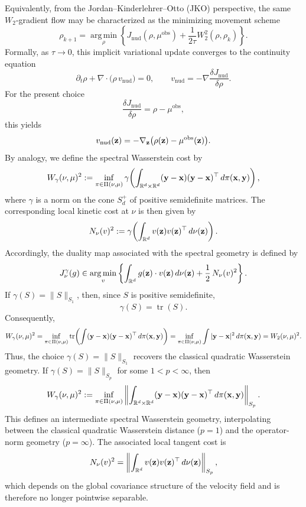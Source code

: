 \documentclass{article}
\theoremstyle{definition}
\begin{document}
Equivalently, from the Jordan--Kinderlehrer--Otto (JKO) perspective, the same $W_2$-gradient flow may be characterized as the minimizing movement scheme
\[
\rho_{k+1}
=
\operatorname*{arg\,min}_{\rho}
\left\{
J_{\mathrm{nud}}(\rho,\mu^{\mathrm{obs}})
+
\frac{1}{2\tau}W_2^2(\rho,\rho_k)
\right\}.
\]
Formally, as $\tau\to 0$, this implicit variational update converges to the continuity equation
\[
\partial_t \rho + \nabla\cdot\bigl(\rho\,v_{\mathrm{nud}}\bigr)=0,
\qquad
v_{\mathrm{nud}}=-\nabla\frac{\delta J_{\mathrm{nud}}}{\delta \rho}.
\]
For the present choice
\[
\frac{\delta J_{\mathrm{nud}}}{\delta \rho}
=
\rho-\mu^{\mathrm{obs}},
\]
this yields
\[
v_{\mathrm{nud}}(\mathbf{z})
=
-\nabla_{\mathbf{z}}\bigl(\rho(\mathbf{z})-\mu^{\mathrm{obs}}(\mathbf{z})\bigr).
\]
By analogy, we define the spectral Wasserstein cost by
\[
W_\gamma(\nu,\mu)^2
:=
\inf_{\pi\in\Pi(\nu,\mu)}
\gamma\!\left(
\int_{\mathbb R^d\times\mathbb R^d}
(\mathbf{y}-\mathbf{x})(\mathbf{y}-\mathbf{x})^\top\,d\pi(\mathbf{x},\mathbf{y})
\right),
\]
where $\gamma$ is a norm on the cone $S_d^+$ of positive semidefinite matrices. The corresponding local kinetic cost at $\nu$ is then given by
\[
N_\nu(v)^2
:=
\gamma\!\left(
\int_{\mathbb R^d} v(\mathbf{z})v(\mathbf{z})^\top\,d\nu(\mathbf{z})
\right).
\]
Accordingly, the duality map associated with the spectral geometry is defined by
\[
J_\nu^\gamma(g)
\in
\operatorname*{arg\,min}_{v}
\left\{
\int_{\mathbb R^d} g(\mathbf{z})\cdot v(\mathbf{z})\,d\nu(\mathbf{z})
+
\frac12\,N_\nu(v)^2
\right\}.
\]
If $\gamma(S)=\|S\|_{S_1}$, then, since $S$ is positive semidefinite,
\[
\gamma(S)=\operatorname{tr}(S).
\]
Consequently,
\[
W_\gamma(\nu,\mu)^2
=
\inf_{\pi\in\Pi(\nu,\mu)}
\operatorname{tr}\!\left(
\int (\mathbf{y}-\mathbf{x})(\mathbf{y}-\mathbf{x})^\top\,d\pi(\mathbf{x},\mathbf{y})
\right)
=
\inf_{\pi\in\Pi(\nu,\mu)}
\int |\mathbf{y}-\mathbf{x}|^2\,d\pi(\mathbf{x},\mathbf{y})
=
W_2(\nu,\mu)^2.
\]
Thus, the choice $\gamma(S)=\|S\|_{S_1}$ recovers the classical quadratic Wasserstein geometry.
If $\gamma(S)=\|S\|_{S_p}$ for some $1<p<\infty$, then
\[
W_\gamma(\nu,\mu)^2
:=
\inf_{\pi\in\Pi(\nu,\mu)}
\left\|
\int_{\mathbb R^d\times\mathbb R^d}
(\mathbf{y}-\mathbf{x})(\mathbf{y}-\mathbf{x})^\top\,d\pi(\mathbf{x},\mathbf{y})
\right\|_{S_p}.
\]
This defines an intermediate spectral Wasserstein geometry, interpolating between the classical quadratic Wasserstein distance ($p=1$) and the operator-norm geometry ($p=\infty$). The associated local tangent cost is
\[
N_\nu(v)^2
=
\left\|
\int_{\mathbb R^d} v(\mathbf{z})v(\mathbf{z})^\top\,d\nu(\mathbf{z})
\right\|_{S_p},
\]
which depends on the global covariance structure of the velocity field and is therefore no longer pointwise separable.
\end{document}
